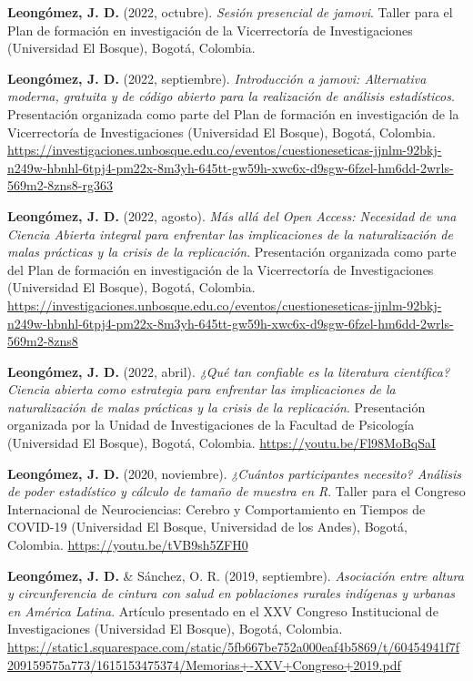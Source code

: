 \documentclass[11pt,a4paper,]{awesome-cv}
\begin{document}
\textbf{Leongómez, J. D.} (2022, octubre). \emph{Sesión presencial de
jamovi}. Taller para el Plan de formación en investigación de la
Vicerrectoría de Investigaciones (Universidad El Bosque), Bogotá,
Colombia.

\textbf{Leongómez, J. D.} (2022, septiembre). \emph{Introducción a
jamovi: Alternativa moderna, gratuita y de código abierto para la
realización de análisis estadísticos}. Presentación organizada como
parte del Plan de formación en investigación de la Vicerrectoría de
Investigaciones (Universidad El Bosque), Bogotá, Colombia.
\url{https://investigaciones.unbosque.edu.co/eventos/cuestioneseticas-jjnlm-92bkj-n249w-hbnhl-6tpj4-pm22x-8m3yh-645tt-gw59h-xwc6x-d9sgw-6fzel-hm6dd-2wrls-569m2-8zns8-rg363}

\textbf{Leongómez, J. D.} (2022, agosto). \emph{Más allá del Open
Access: Necesidad de una Ciencia Abierta integral para enfrentar las
implicaciones de la naturalización de malas prácticas y la crisis de la
replicación}. Presentación organizada como parte del Plan de formación
en investigación de la Vicerrectoría de Investigaciones (Universidad El
Bosque), Bogotá, Colombia.
\url{https://investigaciones.unbosque.edu.co/eventos/cuestioneseticas-jjnlm-92bkj-n249w-hbnhl-6tpj4-pm22x-8m3yh-645tt-gw59h-xwc6x-d9sgw-6fzel-hm6dd-2wrls-569m2-8zns8}

\textbf{Leongómez, J. D.} (2022, abril). \emph{¿Qué tan confiable es la
literatura científica? Ciencia abierta como estrategia para enfrentar
las implicaciones de la naturalización de malas prácticas y la crisis de
la replicación}. Presentación organizada por la Unidad de
Investigaciones de la Facultad de Psicología (Universidad El Bosque),
Bogotá, Colombia. \url{https://youtu.be/Fl98MoBqSaI}

\textbf{Leongómez, J. D.} (2020, noviembre). \emph{¿Cuántos
participantes necesito? Análisis de poder estadístico y cálculo de
tamaño de muestra en R}. Taller para el Congreso Internacional de
Neurociencias: Cerebro y Comportamiento en Tiempos de COVID-19
(Universidad El Bosque, Universidad de los Andes), Bogotá, Colombia.
\url{https://youtu.be/tVB9sh5ZFH0}

\textbf{Leongómez, J. D.} \& Sánchez, O. R. (2019, septiembre).
\emph{Asociación entre altura y circunferencia de cintura con salud en
poblaciones rurales indígenas y urbanas en América Latina}. Artículo
presentado en el XXV Congreso Institucional de Investigaciones
(Universidad El Bosque), Bogotá, Colombia.
\url{https://static1.squarespace.com/static/5fb667be752a000eaf4b5869/t/60454941f7f209159575a773/1615153475374/Memorias+-XXV+Congreso+2019.pdf}
\end{document}
